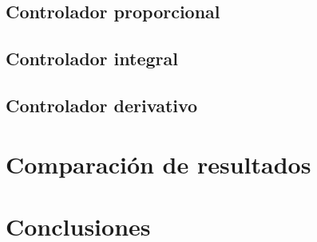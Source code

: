 \documentclass{sig-alternate}
\begin{document}
\subsection{Controlador proporcional}\label{proporcional}

\subsection{Controlador integral}\label{integral}

\subsection{Controlador derivativo}\label{derivativo}

\section{Comparaci\'{o}n de resultados}\label{resultados}

\section{Conclusiones}\label{conclusiones}
\end{document}

